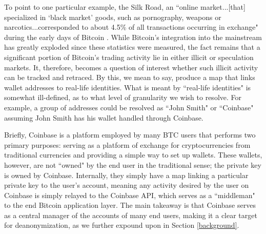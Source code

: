 \documentclass{article}
\begin{document}
To point to one particular example, the Silk Road, an ``online market...[that] specialized in `black market' goods, such as pornography, weapons or narcotics...corresponded to about 4.5\% of all transactions occurring in exchange" during the early days of Bitcoin \cite{silk}. While Bitcoin's integration into the mainstream has greatly exploded since these statistics were measured, the fact remains that a significant portion of Bitcoin's trading activity lie in either illicit or speculation markets. It, therefore, becomes a question of interest whether such illicit activity can be tracked and retraced. By this, we mean to say, produce a map that links wallet addresses to real-life identities. What is meant by ``real-life identities" is somewhat ill-defined, as to what level of granularity we wish to resolve. For example, a group of addresses could be resolved as ``John Smith" or ``Coinbase" assuming John Smith has his wallet handled through Coinbase. 

Briefly, Coinbase is a platform employed by many BTC users that performs two primary purposes: serving as a platform of exchange for cryptocurrencies from traditional currencies and providing a simple way to set up wallets. These wallets, however, are not ``owned" by the end user in the traditional sense; the private key is owned by Coinbase. Internally, they simply have a map linking a particular private key to the user's account, meaning any activity desired by the user on Coinbase is simply relayed to the Coinbase API, which serves as a ``middleman" to the end Bitcoin application layer. The main takeaway is that Coinbase serves as a central manager of the accounts of many end users, making it a clear target for deanonymization, as we further expound upon in Section \ref{background}.
\end{document}
